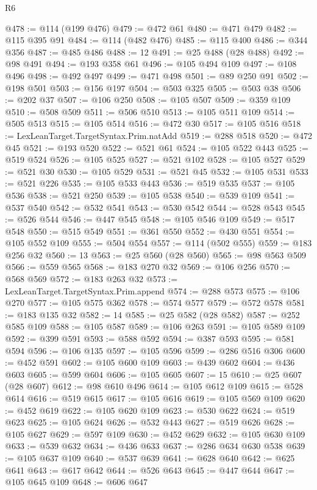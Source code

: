 \begin{lexlean}{R6}
\begin{coremodule}
@478 := @114 (@199 @476)
@479 := @472 @61
@480 := @471 @479
@482 := @115 @395 @91
@484 := @114 (@482 @476)
@485 := @115 @400
@486 := @344 @356
@487 := @485 @486
@488 := 12
@491 := @25 @488 (@28 @488)
@492 := @98 @491
@494 := @193 @358 @61
@496 := @105 @494 @109
@497 := @108 @496
@498 := @492 @497
@499 := @471 @498
@501 := @89 @250 @91
@502 := @198 @501
@503 := @156 @197
@504 := @503 @325
@505 := @503 @38
@506 := @202 @37
@507 := @106 @250
@508 := @105 @507
@509 := @359 @109
@510 := @508 @509
@511 := @506 @510
@513 := @105 @511 @109
@514 := @505 @513
@515 := @105 @514
@516 := @472 @30
@517 := @105 @516
@518 := LexLeanTarget.TargetSyntax.Prim.natAdd
@519 := @288 @518
@520 := @472 @45
@521 := @193 @520
@522 := @521 @61
@524 := @105 @522 @443
@525 := @519 @524
@526 := @105 @525
@527 := @521 @102
@528 := @105 @527
@529 := @521 @30
@530 := @105 @529
@531 := @521 @45
@532 := @105 @531
@533 := @521 @226
@535 := @105 @533 @443
@536 := @519 @535
@537 := @105 @536
@538 := @521 @250
@539 := @105 @538
@540 := @539 @109
@541 := @537 @540
@542 := @532 @541
@543 := @530 @542
@544 := @528 @543
@545 := @526 @544
@546 := @447 @545
@548 := @105 @546 @109
@549 := @517 @548
@550 := @515 @549
@551 := @361 @550
@552 := @430 @551
@554 := @105 @552 @109
@555 := @504 @554
@557 := @114 (@502 @555)
@559 := @183 @256 @32
@560 := 13
@563 := @25 @560 (@28 @560)
@565 := @98 @563 @509
@566 := @559 @565
@568 := @183 @270 @32
@569 := @106 @256
@570 := @568 @569
@572 := @183 @263 @32
@573 := LexLeanTarget.TargetSyntax.Prim.append
@574 := @288 @573
@575 := @106 @270
@577 := @105 @575 @362
@578 := @574 @577
@579 := @572 @578
@581 := @183 @135 @32
@582 := 14
@585 := @25 @582 (@28 @582)
@587 := @252 @585 @109
@588 := @105 @587
@589 := @106 @263
@591 := @105 @589 @109
@592 := @399 @591
@593 := @588 @592
@594 := @387 @593
@595 := @581 @594
@596 := @106 @135
@597 := @105 @596
@599 := @286 @516 @306
@600 := @452 @591
@602 := @105 @600 @109
@603 := @439 @602
@604 := @436 @603
@605 := @599 @604
@606 := @105 @605
@607 := 15
@610 := @25 @607 (@28 @607)
@612 := @98 @610 @496
@614 := @105 @612 @109
@615 := @528 @614
@616 := @519 @615
@617 := @105 @616
@619 := @105 @569 @109
@620 := @452 @619
@622 := @105 @620 @109
@623 := @530 @622
@624 := @519 @623
@625 := @105 @624
@626 := @532 @443
@627 := @519 @626
@628 := @105 @627
@629 := @597 @109
@630 := @452 @629
@632 := @105 @630 @109
@633 := @539 @632
@634 := @436 @633
@637 := @286 @634 @630 @538
@639 := @105 @637 @109
@640 := @537 @639
@641 := @628 @640
@642 := @625 @641
@643 := @617 @642
@644 := @526 @643
@645 := @447 @644
@647 := @105 @645 @109
@648 := @606 @647

\end{coremodule}
\end{lexlean}
